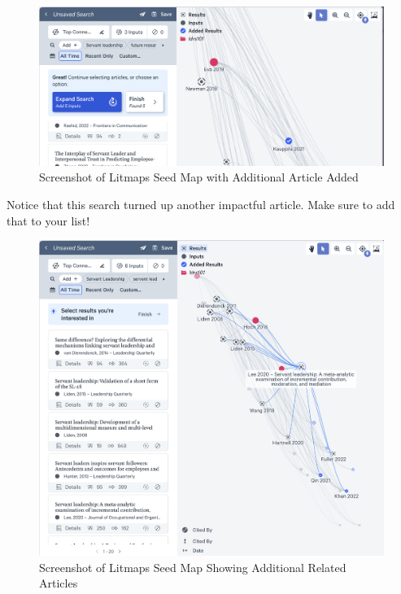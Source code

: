 \documentclass[
  letterpaper,
  DIV=11,
  numbers=noendperiod]{scrreprt}
\begin{document}
\begin{figure}

\caption{\label{fig-litmaps11}Screenshot of Litmaps Seed Map with
Additional Article Added}

\includegraphics{assets/u2/litmaps11.png}

\end{figure}%

Notice that this search turned up another impactful article. Make sure
to add that to your list!

\begin{figure}

\caption{\label{fig-litmaps12}Screenshot of Litmaps Seed Map Showing
Additional Related Articles}

\includegraphics{assets/u2/litmaps12.png}

\end{figure}%
\end{document}
